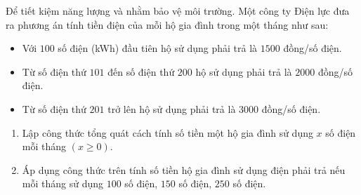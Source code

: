 \begin{bt}%
	Để tiết kiệm năng lượng và nhằm bảo vệ môi trường. Một công ty Điện lực đưa ra phương án tính tiền điện của mỗi hộ gia đình trong một tháng như sau:
	\begin{itemize}
		\item Với $100$ số điện (kWh) đầu tiên hộ sử dụng phải trả là $1500$ đồng/số điện.
		\item Từ số điện thứ $101$ đến số điện thứ $200$ hộ sử dụng phải trả là $2000$ đồng/số điện.
		\item Từ số điện thứ $201$ trở lên hộ sử dụng phải trả là $3000$ đồng/số điện.
	\end{itemize}
	\begin{enumerate}
		\item	Lập công thức tổng quát cách tính số tiền một hộ gia đình sử dụng $x$ số điện mỗi tháng $(x \geq 0)$.
		\item Áp dụng công thức trên tính số tiền hộ gia đình sử dụng điện phải trả nếu mỗi tháng sử dụng $100$ số điện, $150$ số điện, $250$ số điện.
	\end{enumerate}
\end{bt}

